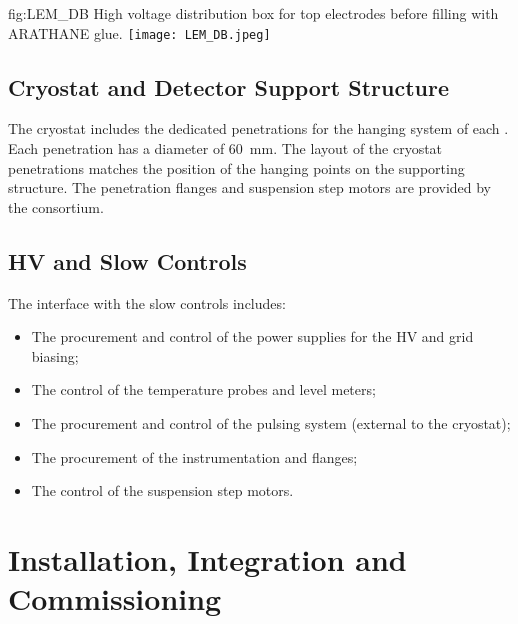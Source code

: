 \begin{dunefigure}
{fig:LEM_DB} 
{High voltage distribution box for  top electrodes before filling with ARATHANE glue. }
  \texttt{[image: LEM\_DB.jpeg]}
\end{dunefigure}


\subsection{Cryostat and Detector Support Structure}
\label{sec:fddp-crp-intfc-support}

The cryostat includes the dedicated penetrations for the hanging system of each . Each penetration has a diameter of \SI{60}{mm}. The layout of the cryostat penetrations   matches the position of the hanging points on the  supporting structure. The penetration flanges and  suspension step motors are provided by the  consortium.

\subsection{HV and Slow Controls}
\label{sec:fddp-crp-intfc-HV-slowcontrol}

The interface with the slow controls includes:

\begin{itemize}
\item The procurement and control of the power supplies for the HV and grid  biasing;
\item The control of the  temperature probes and level meters;
\item The procurement and control of the  pulsing system (external to the cryostat);
\item The procurement of the instrumentation and  \fdth flanges;
\item The control of the  suspension step motors.
\end{itemize}

\section{Installation, Integration and Commissioning}
\label{sec:fddp-crp-install}

